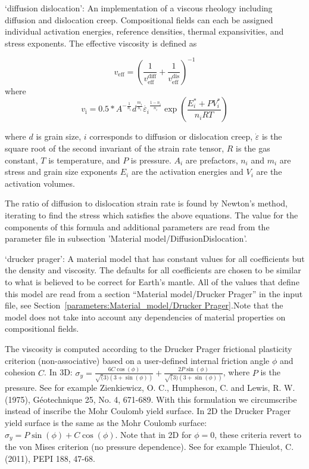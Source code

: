 \begin{itemize}
`diffusion dislocation':  An implementation of a viscous rheology including diffusion and dislocation creep. Compositional fields can each be assigned individual activation energies, reference densities, thermal expansivities, and stress exponents. The effective viscosity is defined as 

 \[v_\text{eff} = \left(\frac{1}{v_\text{eff}^\text{diff}}+ \frac{1}{v_\text{eff}^\text{dis}}\right)^{-1}\] where \[v_\text{i} = 0.5 * A^{-\frac{1}{n_i}} d^\frac{m_i}{n_i} \dot{\varepsilon_i}^{\frac{1-n_i}{n_i}} \exp\left(\frac{E_i^* + PV_i^*}{n_iRT}\right)\] 

 where $d$ is grain size, $i$ corresponds to diffusion or dislocation creep, $\dot{\varepsilon}$ is the square root of the second invariant of the strain rate tensor, $R$ is the gas constant, $T$ is temperature,  and $P$ is pressure. $A_i$ are prefactors, $n_i$ and $m_i$ are stress and grain size exponents $E_i$ are the activation energies and $V_i$ are the activation volumes. 

 The ratio of diffusion to dislocation strain rate is found by Newton's method, iterating to find the stress which satisfies the above equations. The value for the components of this formula and additional parameters are read from the parameter file in subsection 'Material model/DiffusionDislocation'.

`drucker prager': A material model that has constant values for all coefficients but the density and viscosity. The defaults for all coefficients are chosen to be similar to what is believed to be correct for Earth's mantle. All of the values that define this model are read from a section ``Material model/Drucker Prager'' in the input file, see Section~\ref{parameters:Material_model/Drucker Prager}.Note that the model does not take into account any dependencies of material properties on compositional fields. 

The viscosity is computed according to the Drucker Prager frictional plasticity criterion (non-associative) based on a user-defined internal friction angle $\phi$ and cohesion $C$. In 3D:  $\sigma_y = \frac{6 C \cos(\phi)}{\sqrt(3) (3+\sin(\phi))} + \frac{2 P \sin(\phi)}{\sqrt(3) (3+\sin(\phi))}$, where $P$ is the pressure. See for example Zienkiewicz, O. C., Humpheson, C. and Lewis, R. W. (1975), G\'{e}otechnique 25, No. 4, 671-689. With this formulation we circumscribe instead of inscribe the Mohr Coulomb yield surface. In 2D the Drucker Prager yield surface is the same as the Mohr Coulomb surface:  $\sigma_y = P \sin(\phi) + C \cos(\phi)$. Note that in 2D for $\phi=0$, these criteria revert to the von Mises criterion (no pressure dependence). See for example Thieulot, C. (2011), PEPI 188, 47-68. 


\end{itemize}
